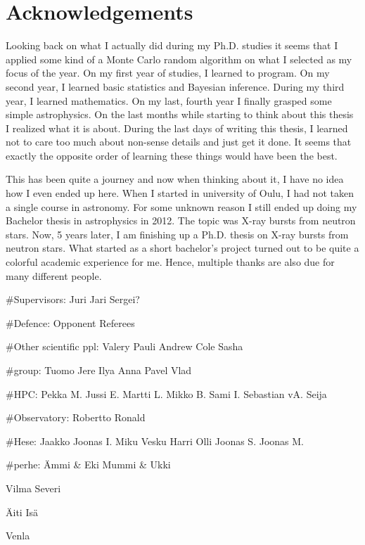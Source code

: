 \chapter*{Acknowledgements}

Looking back on what I actually did during my Ph.D. studies it seems that I applied some kind of a Monte Carlo random algorithm on what I selected as my focus of the year.
On my first year of studies, I learned to program.
On my second year, I learned basic statistics and Bayesian inference.
During my third year, I learned mathematics.
On my last, fourth year I finally grasped some simple astrophysics.
On the last months while starting to think about this thesis I realized what it is about.
During the last days of writing this thesis, I learned not to care too much about non-sense details and just get it done.
It seems that exactly the opposite order of learning these things would have been the best.

This has been quite a journey and now when thinking about it, I have no idea how I even ended up here.
When I started in university of Oulu, I had not taken a single course in astronomy.
For some unknown reason I still ended up doing my Bachelor thesis in astrophysics in 2012.
The topic was X-ray bursts from neutron stars.
Now, 5 years later, I am finishing up a Ph.D. thesis on X-ray bursts from neutron stars.
What started as a short bachelor's project turned out to be quite a colorful academic experience for me.
Hence, multiple thanks are also due for many different people.



#Supervisors:
Juri
Jari
Sergei?

#Defence:
Opponent
Referees

#Other scientific ppl:
Valery
Pauli
Andrew
Cole
Sasha

#group:
Tuomo
Jere
Ilya
Anna
Pavel
Vlad

#HPC:
Pekka M.
Jussi E.
Martti L.
Mikko B.
Sami I.
Sebastian vA.
Seija 

#Observatory:
Robertto
Ronald

#Hese:
Jaakko
Joonas I.
Miku
Vesku
Harri
Olli
Joonas S.
Joonas M.

#perhe:
Ämmi & Eki
Mummi & Ukki

Vilma
Severi

Äiti
Isä

Venla



